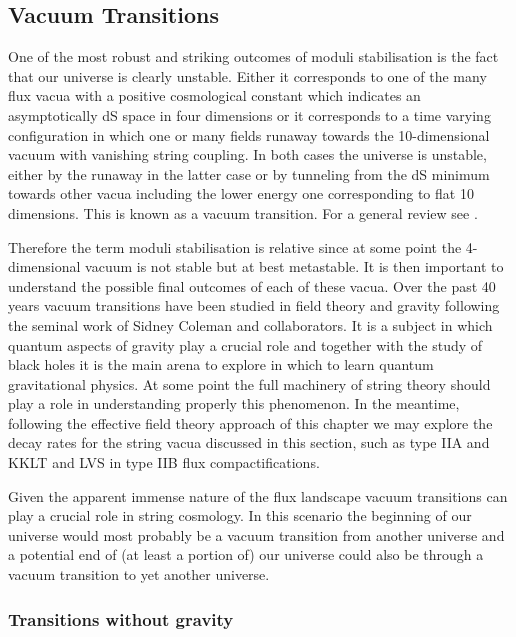 \begin{itemize}
\subsection{Vacuum Transitions}

One of the most robust and striking outcomes of moduli stabilisation is the fact that our universe is clearly unstable. Either it corresponds to one of the many flux vacua with a positive cosmological constant which indicates an asymptotically dS space in four dimensions or it corresponds to a time varying configuration in which one or many fields runaway towards the 10-dimensional vacuum with vanishing string coupling. In both cases the universe is unstable, either by the runaway in the latter case or by tunneling from the dS minimum towards other vacua including the lower energy one corresponding to flat 10 dimensions. This is known as a vacuum transition. For a general review see \cite{Weinberg:2012pjx,Rubakov:2002fi}.

Therefore the term moduli stabilisation is relative since at some point the 4-dimensional vacuum is not stable but at best metastable. It is then important to understand the possible final outcomes of each of these vacua. Over the past 40 years vacuum transitions have been studied in field theory and gravity following the seminal work of Sidney Coleman and collaborators. It is a subject in which quantum aspects of gravity play a crucial role and together with the study of black holes it is the main arena to explore in which to learn quantum gravitational physics. At some point the full machinery of string theory should play a role in understanding properly this phenomenon. In the meantime, following the effective field theory approach of this chapter we may explore the
decay rates for the string vacua discussed in this section, such as type IIA and KKLT and LVS in type IIB flux compactifications.

Given the apparent immense nature of the flux landscape vacuum transitions can play a crucial role in string cosmology. In this scenario the beginning of our universe would most probably be a vacuum transition from another universe and a potential end of (at least a portion of) our universe could also be through a vacuum transition to yet another universe.


\subsubsection*{Transitions without gravity}


\end{itemize}
